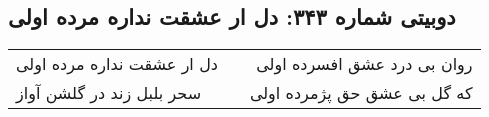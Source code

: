 \begin{center}
\section*{دوبیتی شماره ۳۴۳: دل ار عشقت نداره مرده اولی}
\label{sec:343}
\begin{longtable}{l p{0.5cm} r}
دل ار عشقت نداره مرده اولی
&&
روان بی درد عشق افسرده اولی
\\
سحر بلبل زند در گلشن آواز
&&
که گل بی عشق حق پژمرده اولی
\\
\end{longtable}
\end{center}

